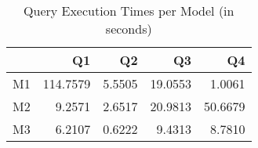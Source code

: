 \begin{table}[H]
\centering
\caption{Query Execution Times per Model (in seconds)}
\label{tab:model_comparison}
\begin{tabular}{lrrrr}
\toprule
 & Q1 & Q2 & Q3 & Q4 \\
\midrule
M1 & 114.7579 & 5.5505 & 19.0553 & 1.0061 \\
M2 & 9.2571 & 2.6517 & 20.9813 & 50.6679 \\
M3 & 6.2107 & 0.6222 & 9.4313 & 8.7810 \\
\bottomrule
\end{tabular}
\end{table}
